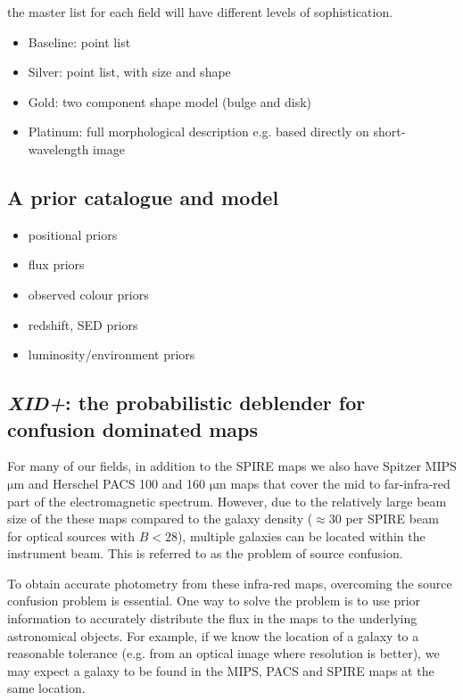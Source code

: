 \documentclass[usenatbib]{mnras}
\begin{document}
the master list for each field will have different levels of sophistication.

\begin{itemize}
  \item{Baseline: point list}
  \item{Silver: point list, with size and shape}
  \item{Gold: two component shape model (bulge and disk)}
  \item{Platinum: full morphological description e.g. based directly on
    short-wavelength image}
\end{itemize}

\subsection[Prior catalogue and model\\{\color{red}Describing how we define the different prior lists in each field/area}]{A prior catalogue and model}

\begin{itemize}
  \item{positional priors}
  \item{flux priors}
  \item{observed colour priors}
  \item{redshift, SED priors}
  \item{luminosity/environment priors}
\end {itemize}

\subsection{\emph{XID+}: the probabilistic deblender for confusion dominated maps}
For many of our fields, in addition to the SPIRE maps we also have Spitzer MIPS $\mathrm{\mu m}$ and Herschel PACS 100 and 160 $\mathrm{\mu m}$ maps that cover the mid to far-infra-red part of the electromagnetic spectrum. However, due to the relatively large beam size of the these maps compared to the galaxy density ($\approx 30$ per SPIRE beam for optical sources with $B < 28$), multiple galaxies can be located within the instrument beam. This is referred to as the problem of source confusion.

To obtain accurate photometry from these infra-red maps, overcoming the source confusion problem is essential. One way to solve the problem is to use prior information to accurately distribute the flux in the maps to the underlying astronomical objects. For example, if we know the location of a galaxy to a reasonable tolerance (e.g. from an optical image where resolution is better), we may expect a galaxy to be found in the MIPS, PACS and SPIRE maps at the same location.
\end{document}

